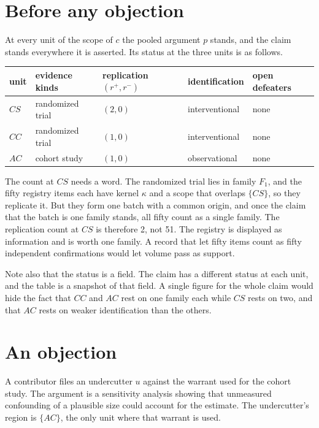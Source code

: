 \documentclass[11pt]{article}
\begin{document}
\section{Before any objection}\label{sec:before}

At every unit of the scope of $c$ the pooled argument $p$ stands, and the claim stands everywhere it is asserted. Its status at the three units is as follows.

\begin{center}
\small
\begin{tabular}{@{}l l l l l@{}}
\toprule
unit & evidence kinds & replication $(r^+,r^-)$ & identification & open defeaters\\
\midrule
$CS$ & randomized trial & $(2,0)$ & interventional & none\\
$CC$ & randomized trial & $(1,0)$ & interventional & none\\
$AC$ & cohort study & $(1,0)$ & observational & none\\
\bottomrule
\end{tabular}
\end{center}

The count at $CS$ needs a word. The randomized trial lies in family $F_1$, and the fifty registry items each have kernel $\kappa$ and a scope that overlaps $\{CS\}$, so they replicate it. But they form one batch with a common origin, and once the claim that the batch is one family stands, all fifty count as a single family. The replication count at $CS$ is therefore 2, not 51. The registry is displayed as information and is worth one family. A record that let fifty items count as fifty independent confirmations would let volume pass as support.

Note also that the status is a field. The claim has a different status at each unit, and the table is a snapshot of that field. A single figure for the whole claim would hide the fact that $CC$ and $AC$ rest on one family each while $CS$ rests on two, and that $AC$ rests on weaker identification than the others.

\section{An objection}\label{sec:objection}

A contributor files an undercutter $u$ against the warrant used for the cohort study. The argument is a sensitivity analysis showing that unmeasured confounding of a plausible size could account for the estimate. The undercutter's region is $\{AC\}$, the only unit where that warrant is used.
\end{document}
